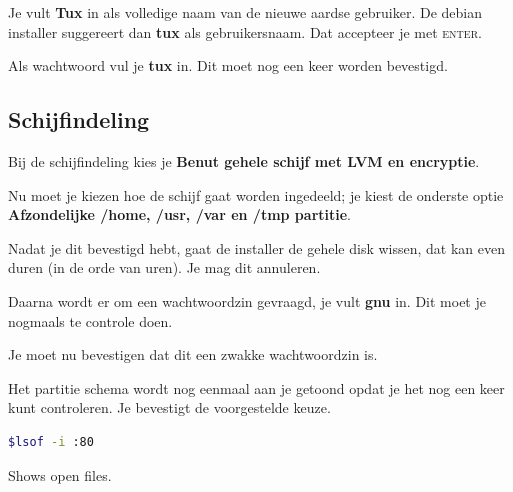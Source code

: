 \documentclass[12pt,a4paper]{article}
\begin{document}
Je vult \textbf{Tux} in als volledige naam van de nieuwe aardse gebruiker.
De debian installer suggereert dan \textbf{tux} als gebruikersnaam.
Dat accepteer je met \textsc{enter}.

Als wachtwoord vul je \textbf{tux} in. Dit moet nog een keer worden bevestigd.
\subsection{Schijfindeling}
Bij de schijfindeling kies je \textbf{Benut gehele schijf met LVM en encryptie}.

Nu moet je kiezen hoe de schijf gaat worden ingedeeld; je kiest de onderste optie \textbf{Afzondelijke /home, /usr, /var en /tmp partitie}.

Nadat je dit bevestigd hebt, gaat de installer de gehele disk wissen, dat kan even duren (in de orde van uren). Je mag dit annuleren.

Daarna wordt er om een wachtwoordzin gevraagd, je vult \textbf{gnu} in. Dit moet je nogmaals te controle doen.

Je moet nu bevestigen dat dit een zwakke wachtwoordzin is. 

Het partitie schema wordt nog eenmaal aan je getoond opdat je het nog een keer kunt controleren. Je bevestigt de voorgestelde keuze.

\begin{lstlisting}[language=bash]
$lsof -i :80
\end{lstlisting}
Shows open files.
\end{document}

